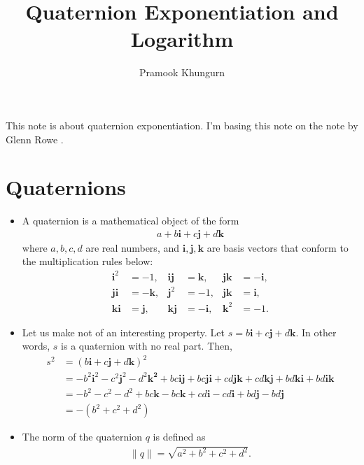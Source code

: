 \documentclass[10pt]{article}
\title{Quaternion Exponentiation and Logarithm}
\author{Pramook Khungurn}
\newcommand{\ve}[1]{\mathbf{#1}}
\begin{document}
\maketitle

This note is about quaternion exponentiation. I'm basing this note on the note by Glenn Rowe \cite{Rowe:2025}.

\section{Quaternions}

\begin{itemize}
    \item A quaternion is a mathematical object of the form
    \begin{align*}
        a + b\ve{i} + c\ve{j} + d\ve{k}
    \end{align*}
    where $a, b, c, d$ are real numbers, and $\ve{i}, \ve{j}, \ve{k}$ are basis vectors that conform to the multiplication rules below:
    \begin{align*}
        \ve{i}^2 &= -1, & \ve{i}\ve{j} &= \ve{k}, & \ve{j}\ve{k} &= -\ve{i}, \\ 
        \ve{j}\ve{i} &= -\ve{k}, & \ve{j}^2 &= -1, & \ve{j}\ve{k} &= \ve{i}, \\
        \ve{k}\ve{i} &= \ve{j}, & \ve{k}\ve{j} &= -\ve{i}, & \ve{k}^2 &= -1.
    \end{align*}

    \item Let us make not of an interesting property. Let $s = b\ve{i} + c\ve{j} + d\ve{k}$. In other words, $s$ is a quaternion with no real part. Then,
    \begin{align*}
        s^2 
        &= (b\ve{i} + c\ve{j} + d\ve{k})^2\\
        &= -b^2\ve{i}^2 -c^2\ve{j}^2 -d^2\ve{k^2} + bc\ve{i}\ve{j} + bc\ve{j}\ve{i} + cd\ve{j}\ve{k} + cd\ve{k}\ve{j} + bd\ve{k}\ve{i} + bd\ve{i}\ve{k} \\
        &= -b^2 -c^2 -d^2 + bc\ve{k} - bc\ve{k} + cd\ve{i} - cd\ve{i} + bd\ve{j} - bd\ve{j} \\
        &= -(b^2 + c^2 + d^2)
    \end{align*}

    \item The norm of the quaternion $q$ is defined as
    \begin{align*}
        \|q\| = \sqrt{a^2 + b^2 + c^2 + d^2}.
    \end{align*}


\end{itemize}
\end{document}

